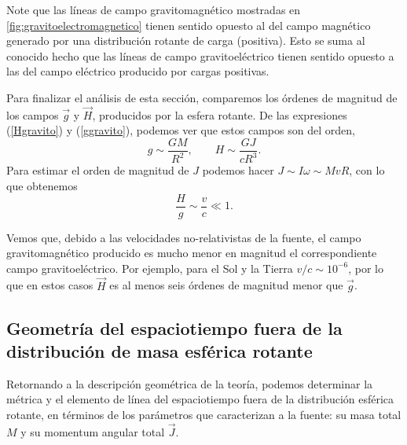 Note que las líneas de campo gravitomagnético mostradas en \ref{fig:gravitoelectromagnetico} tienen sentido opuesto al del campo magnético generado por una distribución rotante de carga (positiva). Esto se suma al conocido hecho que las líneas de campo gravitoeléctrico tienen sentido opuesto a las del campo eléctrico producido por cargas positivas.

Para finalizar el análisis de esta sección, comparemos los órdenes de magnitud de los campos $\vec{g}$ y $\vec{H}$, producidos por la esfera rotante. De las expresiones (\ref{Hgravito}) y (\ref{ggravito}), podemos ver que estos campos son del orden,
\begin{equation}\label{magg}
g\sim \frac{GM}{R^2}, \qquad H\sim \frac{GJ}{cR^3}.
\end{equation}
Para estimar el orden de magnitud de $J$ podemos hacer $J\sim I\omega\sim MvR$, con lo que obtenemos
\begin{equation}
\frac{H}{g}\sim\frac{v}{c}\ll 1.
\end{equation}

Vemos que, debido a las velocidades no-relativistas de la fuente, el campo gravitomagnético producido es mucho menor en magnitud el correspondiente campo gravitoeléctrico. Por ejemplo, para el Sol y la Tierra $v/c\sim10^{-6}$, por lo que en estos casos $\vec{H}$ es al menos seis órdenes de magnitud menor que $\vec{g}$.

\subsection{Geometría del espaciotiempo fuera de la distribución de masa esférica rotante}

Retornando a la descripción geométrica de la teoría, podemos determinar la métrica  y el elemento de línea del espaciotiempo fuera de la distribución esférica rotante, en términos de los parámetros que caracterizan a la fuente: su masa total $M$ y su momentum angular total $\vec{J}$.

